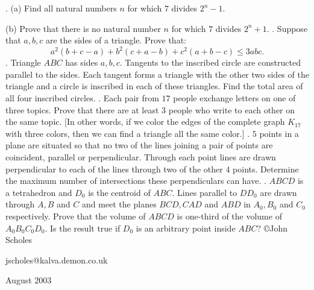 \nopagenumbers
{}
\vskip 25pt
. (a) Find all natural numbers $n$ for which $7$ divides $2^n-1$.

(b) Prove that there is no natural number $n$ for which $7$ divides $2^n+1$.
\vskip 12pt
. Suppose that $a,b,c$ are the sides of a triangle. Prove that: $$a^2(b+c-a)+b^2(c+a-b)+c^2(a+b-c)\le3abc.$$
\vskip 12pt
. Triangle $ABC$ has sides $a,b,c$. Tangents to the inscribed circle are constructed parallel to the sides. Each tangent forms a triangle with the other two sides of the triangle and a circle is inscribed in each of these triangles. Find the total area of all four inscribed circles.
\vskip 12pt
. Each pair from $17$ people exchange letters on one of three topics. Prove that there are at least $3$ people who write to each other on the same topic. [In other words, if we color the edges of the complete graph $K_17$ with three colors, then we can find a triangle all the same color.]
\vskip 12pt
. $5$ points in a plane are situated so that no two of the lines joining a pair of points are coincident, parallel or perpendicular. Through each point lines are drawn perpendicular to each of the lines through two of the other $4$ points. Determine the maximum number of intersections these perpendiculars can have.
\vskip 12pt
. $ABCD$ is a tetrahedron and $D_0$ is the centroid of $ABC$. Lines parallel to $DD_0$ are drawn through $A,B$ and $C$ and meet the planes $BCD,CAD$ and $ABD$ in $A_0,B_0$ and $C_0$ respectively. Prove that the volume of $ABCD$ is one-third of the volume of $A_0B_0C_0D_0$. Is the result true if $D_0$ is an arbitrary point inside $ABC$?
\vskip 20pt
\noindent \copyright John Scholes

\noindent jscholes@kalva.demon.co.uk

 August 2003

\bye
